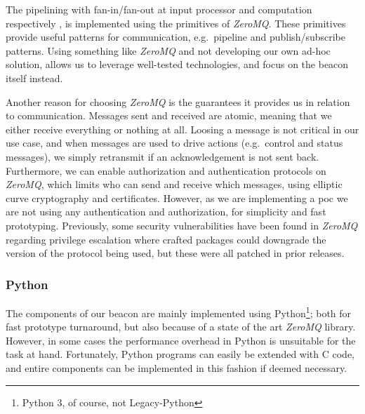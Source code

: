 The pipelining with fan-in/fan-out at input processor and computation respectively , is implemented using the primitives of \textit{ZeroMQ}.
These primitives provide useful patterns for communication, e.g.\ pipeline and publish/subscribe patterns.
Using something like \textit{ZeroMQ} and not developing our own ad-hoc solution, allows us to leverage well-tested technologies, and focus on the beacon itself instead.

Another reason for choosing \textit{ZeroMQ} is the guarantees it provides us in relation to communication.
Messages sent and received are atomic, meaning that we either receive everything or nothing at all.
Loosing a message is not critical in our use case, and when messages are used to drive actions (e.g.\ control and status messages), we simply retransmit if an acknowledgement is not sent back.
Furthermore, we can enable authorization and authentication protocols on \textit{ZeroMQ}, which limits who can send and receive which messages, using elliptic curve cryptography and certificates.
However, as we are implementing a \gls{poc} we are not using any authentication and authorization, for simplicity and fast prototyping.
Previously, some security vulnerabilities have been found in \textit{ZeroMQ} regarding privilege escalation where crafted packages could downgrade the version of the protocol being used, but these were all patched in prior releases.


\subsubsection{Python}
The components of our beacon are mainly implemented using Python\footnote{Python 3, of course, not Legacy-Python}; both for fast prototype turnaround, but also because of a state of the art \textit{ZeroMQ} library.
However, in some cases the performance overhead in Python is unsuitable for the task at hand.
Fortunately, Python programs can easily be extended with C code, and entire components can be implemented in this fashion if deemed necessary.
